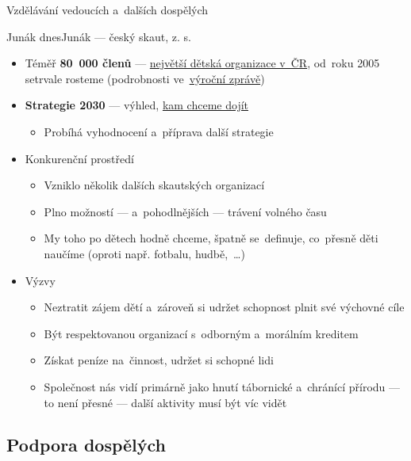 \documentclass[compress, xelatex, 11pt, xcolor=dvipsnames, aspectratio=169, url={hyphens, lowtilde}]{beamer}
\begin{document}
\begin{frame}[allowframebreaks]{Vzdělávání vedoucích a~dalších dospělých}
\begin{itemize}
\begin{frame}{Junák dnes}{Junák --- český skaut, z. s.}
	\begin{itemize}
		\item Téměř \textbf{80~000 členů} --- \href{https://www.skaut.cz/skauting/}{největší dětská organizace v~ČR}, od~roku 2005 setrvale rosteme (podrobnosti ve~\href{https://www.skaut.cz/co-vsechno-jsme-zazili-v-roce-2025-vydali-jsme-vyrocni-zpravu-za-rok-2025/}{výroční zprávě})
		\item \textbf{Strategie 2030} --- výhled, \href{https://krizovatka.skaut.cz/organizace/strategie/strategie-2030}{kam chceme dojít}
		\begin{itemize}
			\item Probíhá vyhodnocení a~příprava další strategie
		\end{itemize}
		\item Konkurenční prostředí
		\begin{itemize}
			\item Vzniklo několik dalších skautských organizací
			\item Plno možností --- a~pohodlnějších --- trávení volného času
			\item My toho po dětech hodně chceme, špatně se~definuje, co~přesně děti naučíme (oproti např. fotbalu, hudbě,~\ldots)
		\end{itemize}
		\item Výzvy
		\begin{itemize}
			\item Neztratit zájem dětí a~zároveň si udržet schopnost plnit své výchovné cíle
			\item Být respektovanou organizací s~odborným a~morálním kreditem
			\item Získat peníze na~činnost, udržet si schopné lidi
			\item Společnost nás vidí primárně jako hnutí tábornické a~chránící přírodu --- to není přesné --- další aktivity musí být víc vidět
		\end{itemize}
	\end{itemize}
\end{frame}

\subsection{Podpora dospělých}


\end{itemize}
\end{frame}
\end{document}
